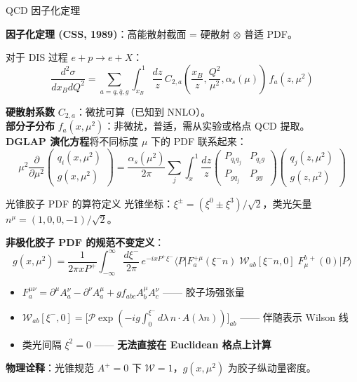 \documentclass[10pt,aspectratio=169]{beamer}
\newcommand{\alphas}{\alpha_s}
\begin{document}
\begin{frame}{QCD 因子化定理}
{\small
\textbf{因子化定理 (CSS, 1989)}：高能散射截面 = 硬散射 $\otimes$ 普适 PDF。

对于 DIS 过程 $e + p \to e + X$：
\begin{equation*}
  \frac{d^2\sigma}{dx_B dQ^2} = \sum_{a=q,\bar{q},g}
  \int_{x_B}^1 \frac{dz}{z}\,
  C_{2,a}\!\left(\frac{x_B}{z}, \frac{Q^2}{\mu^2}, \alphas(\mu)\right)\,
  f_a(z, \mu^2)
\end{equation*}

\textbf{硬散射系数} $C_{2,a}$：微扰可算（已知到 NNLO）。\\
\textbf{部分子分布} $f_a(x,\mu^2)$：非微扰，普适，需从实验或格点 QCD 提取。\\
\textbf{DGLAP 演化方程}将不同标度 $\mu$ 下的 PDF 联系起来：
\begin{equation*}
  \mu^2\frac{\partial}{\partial\mu^2}
  \begin{pmatrix} q_i(x,\mu^2) \\ g(x,\mu^2) \end{pmatrix}
  = \frac{\alphas(\mu^2)}{2\pi} \sum_j \int_x^1 \frac{dz}{z}
  \begin{pmatrix} P_{q_i q_j} & P_{q_i g} \\ P_{g q_j} & P_{gg} \end{pmatrix}
  \begin{pmatrix} q_j(z,\mu^2) \\ g(z,\mu^2) \end{pmatrix}
\end{equation*}
}
\end{frame}

\begin{frame}{光锥胶子 PDF 的算符定义}
\small
光锥坐标：$\xi^\pm = (\xi^0 \pm \xi^3)/\sqrt{2}$，类光矢量 $n^\mu = (1,0,0,-1)/\sqrt{2}$。

\textbf{非极化胶子 PDF 的规范不变定义}：
\begin{equation}
  \boxed{
  g(x, \mu^2) = \frac{1}{2\pi x P^+}
  \int_{-\infty}^{\infty} \frac{d\xi^{-}}{2\pi}\,
  e^{-i x P^+ \xi^{-}}
  \big\langle P \big|
  F_a^{+\mu}(\xi^{-} n)\;
  \mathcal{W}_{ab}[\xi^{-} n, 0]\;
  F_{\mu}^{b\,+}(0)
  \big| P \big\rangle
  }
\end{equation}

\begin{itemize}
  \item $F_a^{\mu\nu} = \partial^\mu A_a^\nu - \partial^\nu A_a^\mu + g f_{abc} A_b^\mu A_c^\nu$ —— 胶子场强张量
  \item $\mathcal{W}_{ab}[\xi^-, 0] = \big[\mathcal{P}\exp(-ig \int_0^{\xi^-} d\lambda\, n\!\cdot\!A(\lambda n))\big]_{ab}$ —— 伴随表示 Wilson 线
  \item 类光间隔 $\xi^2 = 0$ —— \textbf{无法直接在 Euclidean 格点上计算}
\end{itemize}

\textbf{物理诠释}：光锥规范 $A^+=0$ 下 $\mathcal{W}=1$，$g(x,\mu^2)$ 为胶子纵动量密度。
\end{frame}
\end{document}
